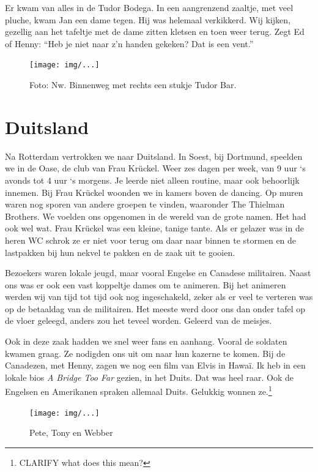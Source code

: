 \documentclass[12pt,twoside]{memoir}
\begin{document}
Er kwam van alles in de Tudor Bodega. In een aangrenzend zaaltje, met veel pluche, kwam Jan een dame tegen. Hij was helemaal verkikkerd. Wij kijken, gezellig aan het tafeltje met de dame zitten kletsen en toen weer terug. Zegt Ed of Henny: ``Heb je niet naar z’n handen gekeken? Dat is een vent.'' 

\begin{figure}[t]
\texttt{[image: img/...]}
\caption{Foto: Nw. Binnenweg met rechts een stukje Tudor Bar.}
\end{figure}

\chapter{Duitsland} %
\label{cha:duitsland}

Na Rotterdam vertrokken we naar Duitsland. In Soest, bij Dortmund, speelden we in de Oase, de club van Frau Krückel. Weer zes dagen per week, van 9 uur `s avonds tot 4 uur `s morgens. Je leerde niet alleen routine, maar ook behoorlijk innemen. Bij Frau Krückel woonden we in kamers boven de dancing. Op muren waren nog sporen van andere groepen te vinden, waaronder The Thielman Brothers. We voelden ons opgenomen in de wereld van de grote namen. Het had ook wel wat. Frau Krückel was een kleine, tanige tante. Als er gelazer was in de heren WC schrok ze er niet voor terug om daar naar binnen te stormen en de lastpakken bij hun nekvel te pakken en de zaak uit te gooien.

Bezoekers waren lokale jeugd, maar vooral Engelse en Canadese militairen. Naast ons was er ook een vast koppeltje dames om te animeren. Bij het animeren werden wij van tijd tot tijd ook nog ingeschakeld, zeker als er veel te verteren was op de betaaldag van de militairen. Het meeste werd door ons dan onder tafel op de vloer geleegd, anders zou het teveel worden. Geleerd van de meisjes. 

Ook in deze zaak hadden we snel weer fans en aanhang. Vooral de soldaten kwamen graag. Ze nodigden ons uit om naar hun kazerne te komen. Bij de Canadezen, met Henny, zagen we nog een film van Elvis in Hawaï. Ik heb in een lokale bios \emph{A Bridge Too Far} gezien, in het Duits. Dat was heel raar. Ook de Engelsen en Amerikanen spraken allemaal Duits. Gelukkig wonnen ze.\footnote{CLARIFY what does this mean?}

\begin{figure}[t]
\texttt{[image: img/...]}
\caption{Pete, Tony en Webber}
\end{figure}
\end{document}
